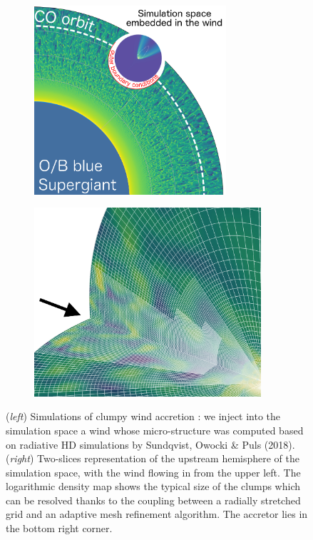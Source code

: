 \documentclass[letterpaper,12pt,onecolumn]{article}
\begin{document}
\begin{figure}[!t]
  \hspace*{-3.5cm}
\begin{subfigure}{0.4\columnwidth}
  \includegraphics[height=7cm]{Figures/config_SgXB_clumps.png}	
\end{subfigure}%
\begin{subfigure}{0.4\columnwidth}
  \hspace*{1.8cm}
  \includegraphics[height=7cm]{Figures/mesh.jpeg}	
\end{subfigure}
\caption{(\textit{left}) Simulations of clumpy wind accretion : we inject into the simulation space a wind whose micro-structure was computed based on radiative HD simulations by Sundqvist, Owocki \& Puls (2018). (\textit{right}) Two-slices representation of the upstream hemisphere of the simulation space, with the wind flowing in from the upper left. The logarithmic density map shows the typical size of the clumps which can be resolved thanks to the coupling between a radially stretched grid and an adaptive mesh refinement algorithm. The accretor lies in the bottom right corner.}
\label{fig:config_SgXB_and_mesh}
\end{figure}
\end{document}
